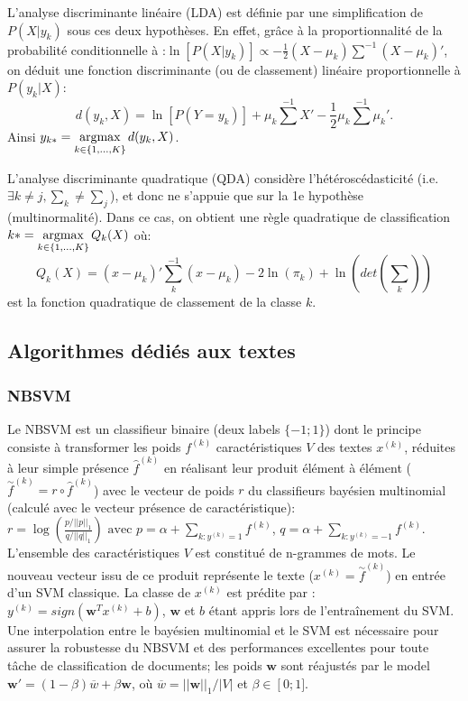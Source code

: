 L'analyse discriminante linéaire (LDA) est définie par une simplification de $P(X \vert y_k)$ sous ces deux hypothèses. En effet, grâce à la proportionnalité de la probabilité conditionnelle à :$\ln\left[P(X \vert y_k)\right] \propto -\frac{1}{2}( X - \mu_k )\sum^{-1}(X - \mu_k )'$, on déduit une fonction discriminante (ou de classement) linéaire proportionnelle à $P(y_k \vert X)$: \[d(y_k, X) = \ln\left[P(Y = y_k)\right] + \mu_k \sum^{-1}X' - \frac{1}{2}\mu_k\sum^{-1}\mu_k'.\] Ainsi $y_{k*} = \mathop{\mathrm{argmax}}\limits_{k \in \lbrace 1,...,K \rbrace} d(y_k, X)$.

L'analyse discriminante quadratique (QDA) considère l'hétéroscédasticité (i.e. $\exists k \neq j, \sum_k \neq \sum_j$), et donc ne s'appuie que sur la 1e hypothèse (multinormalité). Dans ce cas, on obtient une règle quadratique de classification $k* = \mathop{\mathrm{argmax}}\limits_{k \in \lbrace 1,...,K \rbrace} Q_k(X)$ où:
\[Q_k(X) = (x - \mu_k)'\sum_k^{-1}(x - \mu_k) - 2 \ln(\pi_k) + \ln(det(\sum_k))\] est la fonction quadratique de classement de la classe $k$.



\subsection{Algorithmes dédiés aux textes}

\subsubsection{NBSVM}

Le NBSVM \citep{wang2012nbsvm} est un classifieur binaire (deux labels $\lbrace -1; 1 \rbrace$) dont le principe consiste à transformer les poids $f^{(k)}$ caractéristiques $V$ des textes $x^{(k)}$, réduites à leur simple présence $\widehat{f}^{(k)}$ en réalisant leur produit élément à élément ($\overset{\sim}{f}^{(k)} = {r} \circ \widehat{f}^{(k)}$) avec le vecteur de poids $r$ du classifieurs bayésien multinomial (calculé avec le vecteur présence de caractéristique):
$r = \log \left( \frac{p/\vert\vert p \vert\vert_1}{q / \vert\vert q \vert\vert_1}\right)
\text{ avec } p=\alpha + \sum\limits_{k:y^{(k)}=1}{f}^{(k)}$, $q=\alpha + \sum\limits_{k:y^{(k)}=-1}{f}^{(k)}$. L'ensemble des caractéristiques $V$ est constitué de n-grammes de mots. Le nouveau vecteur issu de ce produit représente le texte ($x^{(k)} = \overset{\sim}{f}^{(k)}$) en entrée d'un SVM classique. La classe de $x^{(k)}$ est prédite par : $y^{(k)} = sign(\mathbf{w}^Tx^{(k)} + b)$, $\mathbf{w}$ et $b$ étant appris lors de l'entraînement du SVM. Une interpolation  entre le bayésien multinomial et le SVM est nécessaire pour assurer la robustesse du NBSVM et des performances excellentes pour toute tâche de classification de documents; les poids $\mathbf{w}$ sont réajustés par le model $\mathbf{w'} = (1 - \beta) \overline{w} + \beta \mathbf{w}$, où $\overline{w} = \vert\vert \mathbf{w}\vert\vert_1 / \vert V \vert$ et $\beta \in \left[0; 1] \right.$. 
  
